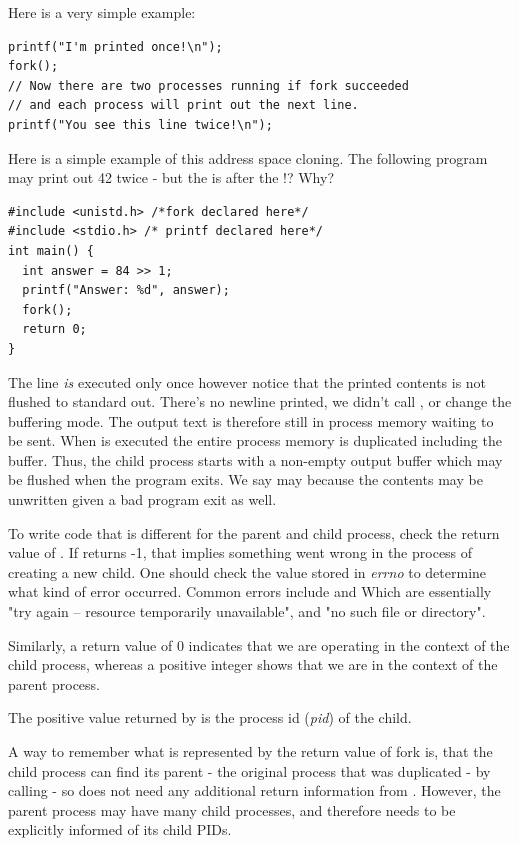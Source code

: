 Here is a very simple example:

\begin{verbatim}
printf("I'm printed once!\n");
fork();
// Now there are two processes running if fork succeeded
// and each process will print out the next line.
printf("You see this line twice!\n");
\end{verbatim}

Here is a simple example of this address space cloning.
The following program may print out 42 twice - but the  is after the !? Why?

\begin{verbatim}
#include <unistd.h> /*fork declared here*/
#include <stdio.h> /* printf declared here*/
int main() {
  int answer = 84 >> 1;
  printf("Answer: %d", answer);
  fork();
  return 0;
}
\end{verbatim}

The  line \emph{is} executed only once however notice that the printed contents is not flushed to standard out.
There's no newline printed, we didn't call , or change the buffering mode.
The output text is therefore still in process memory waiting to be sent.
When  is executed the entire process memory is duplicated including the buffer.
Thus, the child process starts with a non-empty output buffer which may be flushed when the program exits.
We say may because the contents may be unwritten given a bad program exit as well.

To write code that is different for the parent and child process, check the return value of .
If  returns -1, that implies something went wrong in the process of creating a new child.
One should check the value stored in \emph{errno} to determine what kind of error occurred.
Common errors include  and  Which are essentially "try again -- resource temporarily unavailable", and "no such file or directory".

Similarly, a return value of 0 indicates that we are operating in the context of the child process, whereas a positive integer shows that we are in the context of the parent process.

The positive value returned by  is the process id (\emph{pid}) of the child.

A way to remember what is represented by the return value of fork is, that the child process can find its parent - the original process that was duplicated - by calling  - so does not need any additional return information from . However, the parent process may have many child processes, and therefore needs to be explicitly informed of its child PIDs.

